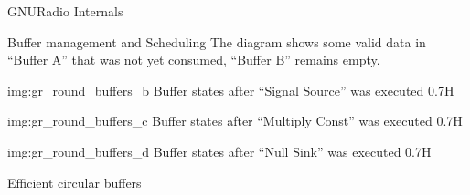 \begin{subchapter}{GNURadio Internals}
\begin{subsubchapter}{Buffer management and Scheduling}
    The diagram shows some valid data in ``Buffer A'' that was
    not yet consumed, ``Buffer B'' remains empty.

                 {img:gr_round_buffers_b}
                 {Buffer states after ``Signal Source'' was executed}
                 {0.7}{H}

                 {img:gr_round_buffers_c}
                 {Buffer states after ``Multiply Const'' was executed}
                 {0.7}{H}

                 {img:gr_round_buffers_d}
                 {Buffer states after ``Null Sink'' was executed}
                 {0.7}{H}

  \end{subsubchapter}

  \begin{subsubchapter}{Efficient circular buffers}
  \end{subsubchapter}
\end{subchapter}
